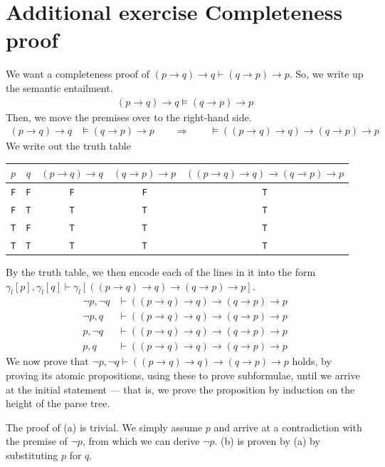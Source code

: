\documentclass[11pt,a4paper]{article}
\let\imp\to
\begin{document}
\section*{Additional exercise \mdseries Completeness proof}
We want a completeness proof of $(p \imp q) \imp q \vdash (q \imp p) \imp p$. So, we write up the semantic entailment.
\begin{align*}
	(p \imp q) \imp q \models (q \imp p) \imp p
\end{align*}
Then, we move the premises over to the right-hand side.
\begin{align*}
	(p \imp q) \imp q &\models (q \imp p) \imp p
	\qquad \Rightarrow \qquad
	\models ((p \imp q) \imp q) \imp (q \imp p) \imp p
\end{align*}
We write out the truth table
\begin{center}
	\begin{tabu}{cccc|c}
		$p$ & $q$ & $(p \imp q) \imp q$ & $(q \imp p) \imp p$ & $((p \imp q) \imp q) \imp (q \imp p) \imp p$ \\ \hline
		{\tt F} & {\tt F} & {\tt F} & {\tt F} & {\tt T} \\
		{\tt F} & {\tt T} & {\tt T} & {\tt T} & {\tt T} \\
		{\tt T} & {\tt F} & {\tt T} & {\tt T} & {\tt T} \\
		{\tt T} & {\tt T} & {\tt T} & {\tt T} & {\tt T}
	\end{tabu}
\end{center}
By the truth table, we then encode each of the lines in it into the form $\gamma_l[p], \gamma_l[q] \vdash \gamma_l[((p \imp q) \imp q) \imp (q \imp p) \imp p]$.
\begin{align*}
	\neg p, \neg q &\vdash ((p \imp q) \imp q) \imp (q \imp p) \imp p \\
	\neg p, q &\vdash ((p \imp q) \imp q) \imp (q \imp p) \imp p \\
	p, \neg q &\vdash ((p \imp q) \imp q) \imp (q \imp p) \imp p \\
	p, q &\vdash ((p \imp q) \imp q) \imp (q \imp p) \imp p
\end{align*}
We now prove that $\neg p, \neg q \vdash ((p \imp q) \imp q) \imp (q \imp p) \imp p$ holds, by proving its atomic propositions, using these to prove subformulae, until we arrive at the initial statement --- that is, we prove the proposition by induction on the height of the parse tree.

The proof of (a) is trivial. We simply assume $p$ and arrive at a contradiction with the premise of $\neg p$, from which we can derive $\neg p$. (b) is proven by (a) by substituting $p$ for $q$.
\end{document}
